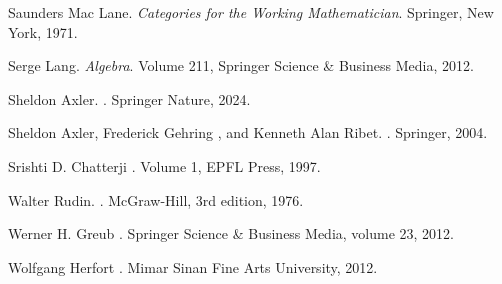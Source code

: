 \documentclass[a4paper, 14pt]{report}
\begin{document}
\begin{onehalfspace}
{\begin{thebibliography}{99}
	Saunders Mac Lane.
	\newblock \emph{Categories for the Working Mathematician}.
	\newblock Springer, New York, 1971.
	
	Serge Lang.
	\newblock \emph{Algebra}.
	\newblock Volume 211, Springer Science \& Business Media, 2012.

		
	Sheldon Axler.
	.
	\newblock Springer Nature, 2024.
	
	Sheldon Axler, Frederick Gehring , and Kenneth Alan Ribet.
	.
	\newblock Springer, 2004.
	
	Srishti D. Chatterji  
	.  
	\newblock Volume 1, EPFL Press, 1997.
	
	Walter Rudin.  
	.  
	\newblock McGraw-Hill, 3rd edition, 1976.

	Werner H. Greub
	.
	\newblock Springer Science \& Business Media, volume 23, 2012.
	
	
	Wolfgang Herfort  
	.  
	\newblock Mimar Sinan Fine Arts University, 2012. 
	

	

	

	
	 
	
	
	
	

	
 


	

	
\end{thebibliography}
	
}


\end{onehalfspace} 
\end{document}
